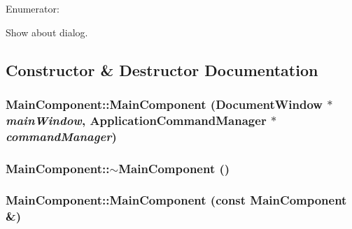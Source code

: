 \begin{CompactItemize}
\begin{Desc}
\item[Enumerator: ]\par
\begin{description}
\item[{\em 
\hypertarget{class_main_component_9d7ddc68ebc8f05ba8c6004bd2b538f7030b25978873cede4c60b51ab1985961}{
about}
\label{class_main_component_9d7ddc68ebc8f05ba8c6004bd2b538f7030b25978873cede4c60b51ab1985961}
}]Show about dialog. \end{description}
\end{Desc}



\subsection{Constructor \& Destructor Documentation}
\hypertarget{class_main_component_1239f0e24e2bcfc66e4791956f67e2d0}{
\subsubsection[{MainComponent}]{\setlength{\rightskip}{0pt plus 5cm}MainComponent::MainComponent (DocumentWindow $\ast$ {\em mainWindow}, \/  ApplicationCommandManager $\ast$ {\em commandManager})}}
\label{class_main_component_1239f0e24e2bcfc66e4791956f67e2d0}


\hypertarget{class_main_component_a96a2a286f35edf4000deec5f327d1c3}{
\subsubsection[{$\sim$MainComponent}]{\setlength{\rightskip}{0pt plus 5cm}MainComponent::$\sim$MainComponent ()}}
\label{class_main_component_a96a2a286f35edf4000deec5f327d1c3}


\hypertarget{class_main_component_56c264d7765c7463f4c9c0ca7d21e709}{
\subsubsection[{MainComponent}]{\setlength{\rightskip}{0pt plus 5cm}MainComponent::MainComponent (const {\bf MainComponent} \&)}}
\label{class_main_component_56c264d7765c7463f4c9c0ca7d21e709}



\end{CompactItemize}
